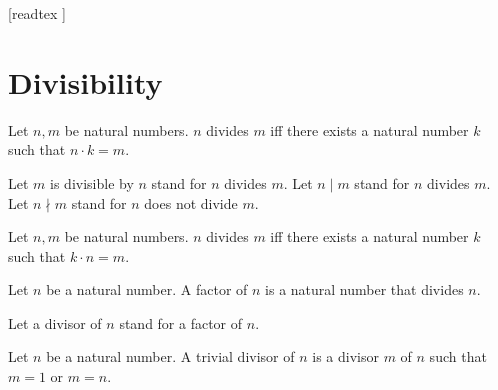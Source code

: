 \documentclass[10pt]{article}
\begin{document}
  \begin{imports}
    \begin{forthel}
      [readtex ]
    \end{forthel}
  \end{imports}


  \section*{Divisibility}

  \begin{forthel}
    \begin{definition}[id=ARITHMETIC_07_4239998993825792,printid]
      Let $n, m$ be natural numbers.
      $n$ divides $m$ iff there exists a natural number $k$ such that $n \cdot k = m$.
    \end{definition}

    Let $m$ is divisible by $n$ stand for $n$ divides $m$.
    Let $n \mid m$ stand for $n$ divides $m$.
    Let $n \nmid m$ stand for $n$ does not divide $m$.
  \end{forthel}

  \begin{forthel}
    \begin{lemma}[id=ARITHMETIC_07_1478855118290944,printid]
      Let $n, m$ be natural numbers.
      $n$ divides $m$ iff there exists a natural number $k$ such that $k \cdot n = m$.
    \end{lemma}
  \end{forthel}

  \begin{forthel}
    \begin{definition}[id=ARITHMETIC_07_1311437490225152,printid]
      Let $n$ be a natural number.
      A factor of $n$ is a natural number that divides $n$.
    \end{definition}

    Let a divisor of $n$ stand for a factor of $n$.
  \end{forthel}

  \begin{forthel}
    \begin{definition}[id=ARITHMETIC_10_5438991513944064,printid]
      Let $n$ be a natural number.
      A trivial divisor of $n$ is a divisor $m$ of $n$ such that $m = 1$ or $m = n$.
    \end{definition}
  \end{forthel}
\end{document}
